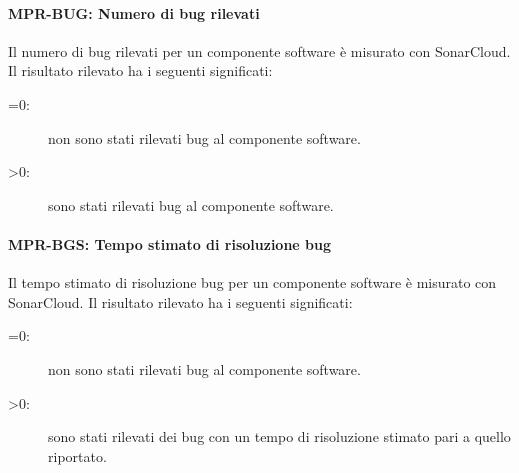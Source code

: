 \documentclass[../../norme-di-progetto.tex]{subfiles}
\begin{document}
\paragraph{MPR-BUG: Numero di bug rilevati}%
\label{par:MPR-BUG_percentuale_duplicazione_codice}

Il numero di bug rilevati per un componente software è misurato con SonarCloud.
Il risultato rilevato ha i seguenti significati:
\begin{description}
  \item[=0:] non sono stati rilevati bug al componente software.
  \item[>0:] sono stati rilevati bug al componente software.
\end{description}


\paragraph{MPR-BGS: Tempo stimato di risoluzione bug}%
\label{par:MPR-BGS_tempo_stimato_risoluzione_bug}

Il tempo stimato di risoluzione bug per un componente software è misurato con SonarCloud.
Il risultato rilevato ha i seguenti significati:
\begin{description}
  \item[=0:] non sono stati rilevati bug al componente software.
  \item[>0:] sono stati rilevati dei bug con un tempo di risoluzione stimato pari a quello riportato.
\end{description}





\end{document}
